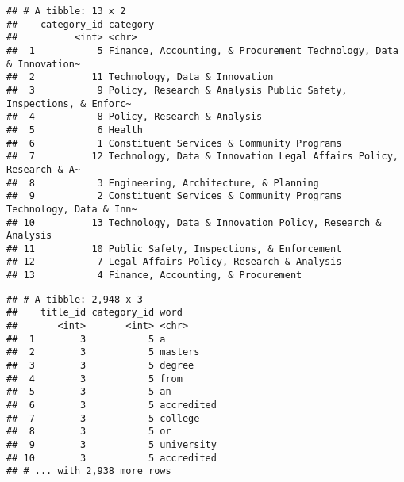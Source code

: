 \documentclass[]{article}
\newenvironment{Shaded}{\begin{snugshade}}{\end{snugshade}}
\newcommand{\KeywordTok}[1]{\textcolor[rgb]{0.13,0.29,0.53}{\textbf{#1}}}
\newcommand{\NormalTok}[1]{#1}
\newcommand{\OperatorTok}[1]{\textcolor[rgb]{0.81,0.36,0.00}{\textbf{#1}}}
\newcommand{\StringTok}[1]{\textcolor[rgb]{0.31,0.60,0.02}{#1}}
\begin{document}
\begin{verbatim}
## # A tibble: 13 x 2
##    category_id category                                                         
##          <int> <chr>                                                            
##  1           5 Finance, Accounting, & Procurement Technology, Data & Innovation~
##  2          11 Technology, Data & Innovation                                    
##  3           9 Policy, Research & Analysis Public Safety, Inspections, & Enforc~
##  4           8 Policy, Research & Analysis                                      
##  5           6 Health                                                           
##  6           1 Constituent Services & Community Programs                        
##  7          12 Technology, Data & Innovation Legal Affairs Policy, Research & A~
##  8           3 Engineering, Architecture, & Planning                            
##  9           2 Constituent Services & Community Programs Technology, Data & Inn~
## 10          13 Technology, Data & Innovation Policy, Research & Analysis        
## 11          10 Public Safety, Inspections, & Enforcement                        
## 12           7 Legal Affairs Policy, Research & Analysis                        
## 13           4 Finance, Accounting, & Procurement
\end{verbatim}

\begin{Shaded}
\end{Shaded}

\begin{verbatim}
## # A tibble: 2,948 x 3
##    title_id category_id word      
##       <int>       <int> <chr>     
##  1        3           5 a         
##  2        3           5 masters   
##  3        3           5 degree    
##  4        3           5 from      
##  5        3           5 an        
##  6        3           5 accredited
##  7        3           5 college   
##  8        3           5 or        
##  9        3           5 university
## 10        3           5 accredited
## # ... with 2,938 more rows
\end{verbatim}
\end{document}
